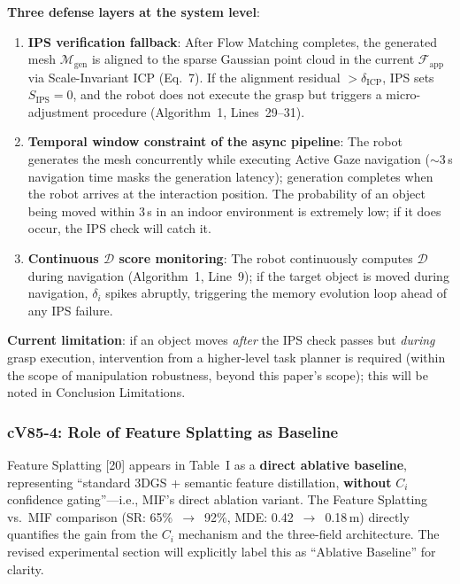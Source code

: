 \documentclass[10pt,a4paper]{article}
\begin{document}
\textbf{Three defense layers at the system level}:
\begin{enumerate}[leftmargin=2em,topsep=2pt,itemsep=2pt]
  \item \textbf{IPS verification fallback}: After Flow Matching completes, the generated mesh $\mathcal{M}_{\text{gen}}$ is aligned to the sparse Gaussian point cloud in the current $\mathcal{F}_{\text{app}}$ via Scale-Invariant ICP (Eq.~7). If the alignment residual $>\delta_{\text{ICP}}$, IPS sets $S_{\text{IPS}}=0$, and the robot does not execute the grasp but triggers a micro-adjustment procedure (Algorithm~1, Lines~29--31).
  \item \textbf{Temporal window constraint of the async pipeline}: The robot generates the mesh concurrently while executing Active Gaze navigation (${\sim}$3\,s navigation time masks the generation latency); generation completes when the robot arrives at the interaction position. The probability of an object being moved within 3\,s in an indoor environment is extremely low; if it does occur, the IPS check will catch it.
  \item \textbf{Continuous $\mathcal{D}$ score monitoring}: The robot continuously computes $\mathcal{D}$ during navigation (Algorithm~1, Line~9); if the target object is moved during navigation, $\delta_i$ spikes abruptly, triggering the memory evolution loop ahead of any IPS failure.
\end{enumerate}
\textbf{Current limitation}: if an object moves \emph{after} the IPS check passes but \emph{during} grasp execution, intervention from a higher-level task planner is required (within the scope of manipulation robustness, beyond this paper's scope); this will be noted in Conclusion Limitations.

\subsubsection*{cV85-4: Role of Feature Splatting as Baseline}

Feature Splatting [20] appears in Table~I as a \textbf{direct ablative baseline}, representing ``standard 3DGS + semantic feature distillation, \textbf{without} $C_i$ confidence gating''---i.e., MIF's direct ablation variant. The Feature Splatting vs.\ MIF comparison (SR: 65\%~$\to$~92\%, MDE: 0.42~$\to$~0.18\,m) directly quantifies the gain from the $C_i$ mechanism and the three-field architecture. The revised experimental section will explicitly label this as ``Ablative Baseline'' for clarity.
\end{document}
